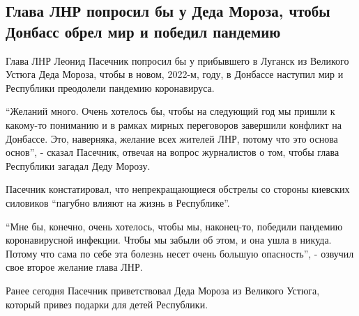  
 
 
 
 
\subsection{Глава ЛНР попросил бы у Деда Мороза, чтобы Донбасс обрел мир и победил пандемию}
\label{sec:24_12_2021.stz.news.lnr.lug_info.2.pasechnik_ded_moroz}

\begin{multicols}{2} %
\setlength{\parindent}{0pt}

Глава ЛНР Леонид Пасечник попросил бы у прибывшего в Луганск из Великого Устюга
Деда Мороза, чтобы в новом, 2022-м, году, в Донбассе наступил мир и Республики
преодолели пандемию коронавируса.


\enquote{Желаний много. Очень хотелось бы, чтобы на следующий год мы пришли к какому-то
пониманию и в рамках мирных переговоров завершили конфликт на Донбассе. Это,
наверняка, желание всех жителей ЛНР, потому что это основа основ}, - сказал
Пасечник, отвечая на вопрос журналистов о том, чтобы глава Республики загадал
Деду Морозу.

Пасечник констатировал, что непрекращающиеся обстрелы со стороны киевских
силовиков \enquote{пагубно влияют на жизнь в Республике}.

\enquote{Мне бы, конечно, очень хотелось, чтобы мы, наконец-то, победили пандемию
коронавирусной инфекции. Чтобы мы забыли об этом, и она ушла в никуда. Потому
что сама по себе эта болезнь несет очень большую опасность}, - озвучил свое
второе желание глава ЛНР.

Ранее сегодня Пасечник приветствовал Деда Мороза из Великого Устюга, который
привез подарки для детей Республики.
\end{multicols} %
